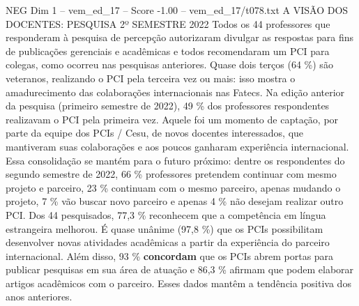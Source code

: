 \begin{textsample}{NEG Dim 1 – vem\_ed\_17 – Score -1.00 – vem\_ed\_17/t078.txt}  \label{ex:f1_neg_025}
A VISÃO DOS DOCENTES: PESQUISA 2º SEMESTRE 2022 Todos os 44 professores que responderam à pesquisa de percepção autorizaram divulgar as respostas para fins de publicações gerenciais e acadêmicas e todos recomendaram um PCI para colegas, como ocorreu nas pesquisas anteriores.
Quase dois terços (64 \%) são veteranos, realizando o PCI pela terceira vez ou mais: isso mostra o amadurecimento das colaborações internacionais nas Fatecs.
Na edição anterior da pesquisa (primeiro semestre de 2022), 49 \% dos professores respondentes realizavam o PCI pela primeira vez.
Aquele foi um momento de captação, por parte da equipe dos PCIs / Cesu, de novos docentes interessados, que mantiveram suas colaborações e aos poucos ganharam experiência internacional.
Essa consolidação se mantém para o futuro próximo: dentre os respondentes do segundo semestre de 2022, 66 \% professores pretendem continuar com mesmo projeto e parceiro, 23 \% continuam com o mesmo parceiro, apenas mudando o projeto, 7 \% vão buscar novo parceiro e apenas 4 \% não desejam realizar outro PCI.
Dos 44 pesquisados, 77,3 \% reconhecem que a competência em língua estrangeira melhorou.
É quase unânime (97,8 \%) que os PCIs possibilitam desenvolver novas atividades acadêmicas a partir da experiência do parceiro internacional.
Além disso, 93 \% \textbf{concordam} que os PCIs abrem portas para publicar pesquisas em sua área de atuação e 86,3 \% afirmam que podem elaborar artigos acadêmicos com o parceiro.
Esses dados mantêm a tendência positiva dos anos anteriores.

\end{textsample}
